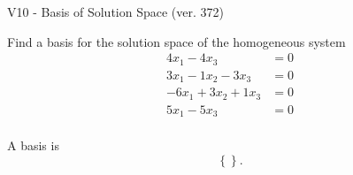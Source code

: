 \begin{exercise}
  \begin{exerciseTitle}V10 - Basis of Solution Space (ver. 372)\end{exerciseTitle}
  \begin{exerciseStatement}
    Find a basis for the solution space of the homogeneous system 
\begin{align*}
 4 x_ 1 -4 x_ 3 &= 0  \\ 
  3 x_ 1 -1 x_ 2 -3 x_ 3 &= 0  \\ 
  -6 x_ 1 + 3 x_ 2 + 1 x_ 3 &= 0  \\ 
  5 x_ 1 -5 x_ 3 &= 0  \\ 
 \end{align*}


 
  \end{exerciseStatement}

  \begin{exerciseAnswer}
   A basis is   
\[\left\{\right\}.\]

  


  \end{exerciseAnswer}
\end{exercise}